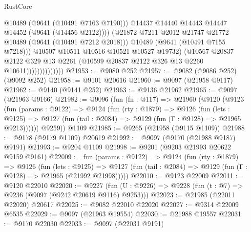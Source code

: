 \begin{lexlean}{RustCore}
\begin{coremodule}
                                      @10489
                                      (@9641 (@10491 @7163 @7190)))
                                    @14437
                                    @14440
                                    @14443
                                    @14447
                                    @14452
                                    (@9641 (@14456 @2122))))
                                (@21872
                                  @7211
                                  @2012
                                  @21747
                                  @21772
                                  @10489
                                  (@9641 (@10491 @7212 @2018)))
                                @10489
                                (@9641 (@10491 @7155 @7218)))
                              @10507
                              @10511
                              @10516
                              @10521
                              @10527
                              @19732)
                            (@10567
                              @20837
                              @2122
                              @329
                              @13
                              @2261
                              (@10599 @20837 @2122 @326 @13 @2260 @10611))))))))))))))
@21953 := @9080 @252
@21957 := @9082 (@9086 @252) (@9092 @252)
@21958 := @9101 @20616
@21960 := @9097 (@21958 @9117)
@21962 := @9140 (@9141 @252)
@21963 := @9136 @21962
@21965 := @9097 (@21963 @9166)
@21982 := @9096
    (fun (fn : @117) =>
    @21960
      (@9120
        (@9123
          (fun (params : @9122) =>
          @9124
            (fun (rty : @1879) =>
            @9126
              (fun (lets : @9125) =>
              @9127 (fun (tail : @2084) => @9129 (fun (Γ : @9128) => @21965 @9213))))))
        @9259))
    @1109
@21985 := @9265 (@21958 (@9115 @1109))
@21988 := @9178 (@9179 @1109) @20619
@21992 := @9097 (@9170 (@21988 @9187) @9191)
@21993 := @9204 @1109
@21998 := @9201 (@9203 @21993 @20622 @9159 @9161)
@22009 := fun (params : @9122) =>
  @9124
    (fun (rty : @1879) =>
    @9126
      (fun (lets : @9125) =>
      @9127 (fun (tail : @2084) => @9129 (fun (Γ : @9128) => @21965 (@21992 @21998)))))
@22010 := @9123 @22009
@22011 := @9120 @22010
@22020 := @9227
    (fun (U : @9226) => @9228 (fun (t : @7) => @9236 (@9097 (@9242 @20619 @9116) @9253)))
@22023 := @21985 (@22011 @22020) @20617
@22025 := @9082 @22010 @22020
@22027 := @9314 @22009 @6535
@22029 := @9097 (@21963 @19554)
@22030 := @21988 @19557
@22031 := @9170 @22030
@22033 := @9097 (@22031 @9191)

\end{coremodule}
\end{lexlean}
